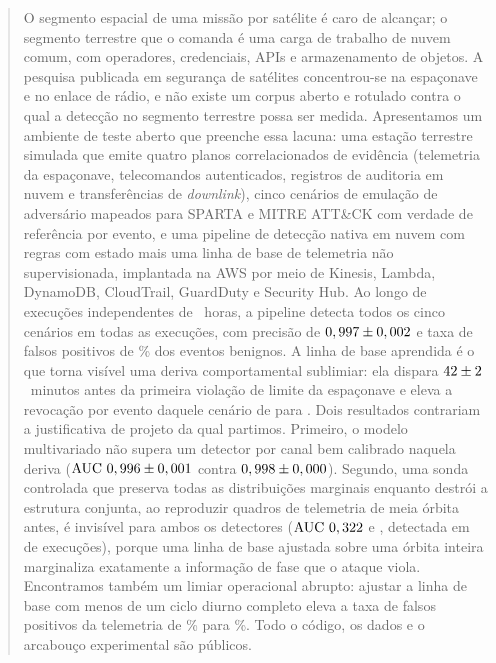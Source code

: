 \documentclass[conference]{IEEEtran}
\begin{document}
\begin{abstract}
O segmento espacial de uma missão por satélite é caro de alcançar; o segmento
terrestre que o comanda é uma carga de trabalho de nuvem comum, com operadores,
credenciais, APIs e armazenamento de objetos. A pesquisa publicada em segurança
de satélites concentrou-se na espaçonave e no enlace de rádio, e não existe um
corpus aberto e rotulado contra o qual a detecção no segmento terrestre possa
ser medida. Apresentamos um ambiente de teste aberto que preenche essa lacuna:
uma estação terrestre simulada que emite quatro planos correlacionados de
evidência (telemetria da espaçonave, telecomandos autenticados, registros de
auditoria em nuvem e transferências de \emph{downlink}), cinco cenários de
emulação de adversário mapeados para SPARTA e MITRE ATT\&CK com verdade de
referência por evento, e uma pipeline de detecção nativa em nuvem com
\expRuleCount{} regras com estado mais uma linha de base de telemetria não
supervisionada, implantada na AWS por meio de Kinesis, Lambda, DynamoDB,
CloudTrail, GuardDuty e Security Hub. Ao longo de \expNumSeeds{} execuções
independentes de \expSimHours~horas, a pipeline detecta todos os cinco cenários
em todas as execuções, com precisão de $\expPrecision \pm \expPrecisionSD$ e
taxa de falsos positivos de \expFprOverall\% dos eventos benignos. A linha de
base aprendida é o que torna visível uma deriva comportamental sublimiar: ela
dispara $\expLeadMean \pm \expLeadSD$~minutos antes da primeira violação de
limite da espaçonave e eleva a revocação por evento daquele cenário de
\expRecAnomalyRules{} para \expRecAnomalousBehavior{}. Dois resultados
contrariam a justificativa de projeto da qual partimos. Primeiro, o modelo
multivariado não supera um detector por canal bem calibrado naquela deriva
($\mathrm{AUC}\ \expAucMulti \pm \expAucMultiSD$ contra
$\expAucUni \pm \expAucUniSD$). Segundo, uma sonda controlada que preserva todas
as distribuições marginais enquanto destrói a estrutura conjunta, ao reproduzir
quadros de telemetria de meia órbita antes, é invisível para ambos os
detectores ($\mathrm{AUC}\ \expAucSwapMulti$ e \expAucSwapUni{}, detectada em
\expSwapDetectedMulti{} de \expNumSeeds{} execuções), porque uma linha de base
ajustada sobre uma órbita inteira marginaliza exatamente a informação de fase que
o ataque viola. Encontramos também um limiar operacional abrupto: ajustar a linha
de base com menos de um ciclo diurno completo eleva a taxa de falsos positivos da
telemetria de \expFprFullDay\% para \expFprOneHour\%. Todo o código, os dados e
o arcabouço experimental são públicos.
\end{abstract}
\end{document}
